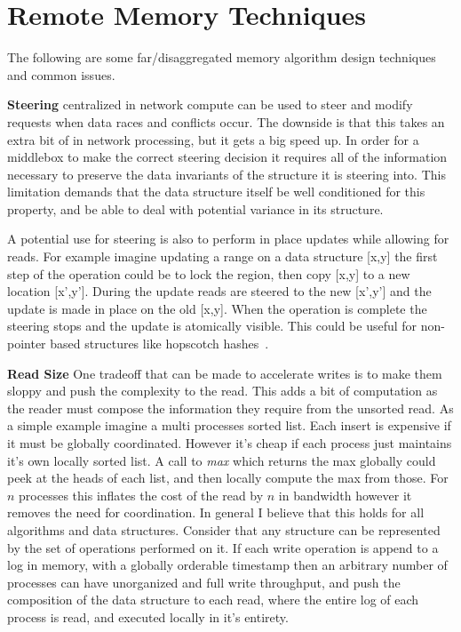 \section{Remote Memory Techniques}

The following are some far/disaggregated memory algorithm design techniques and
common issues.


\textbf{Steering} centralized in network compute can be used to steer and modify
requests when data races and conflicts occur. The downside is that this takes an
extra bit of in network processing, but it gets a big speed up. In order for a
middlebox to make the correct steering decision it requires all of the
information necessary to preserve the data invariants of the structure it is
steering into. This limitation demands that the data structure itself be well
conditioned for this property, and be able to deal with potential variance in
its structure.

A potential use for steering is also to perform in place updates while allowing
for reads. For example imagine updating a range on a data structure [x,y] the
first step of the operation could be to lock the region, then copy [x,y] to a
new location [x',y']. During the update reads are steered to the new [x',y'] and
the update is made in place on the old [x,y]. When the operation is complete the
steering stops and the update is atomically visible. This could be useful for
non-pointer based structures like hopscotch hashes~\cite{hopscotch}.

\textbf{Read Size} One tradeoff that can be made to accelerate writes is to make
them sloppy and push the complexity to the read. This adds a bit of computation
as the reader must compose the information they require from the unsorted read.
As a simple example imagine a multi processes sorted list. Each insert is
expensive if it must be globally coordinated. However it's cheap if each process
just maintains it's own locally sorted list. A call to \textit{max} which
returns the max globally could peek at the heads of each list, and then locally
compute the max from those. For $n$ processes this inflates the cost of the read
by $n$ in bandwidth however it removes the need for coordination. In general I
believe that this holds for all algorithms and data structures. Consider that any
structure can be represented by the set of operations performed on it. If each
write operation is append to a log in memory, with a globally orderable
timestamp then an arbitrary number of processes can have unorganized and full
write throughput, and push the composition of the data structure to each read,
where the entire log of each process is read, and executed locally in it's
entirety.

